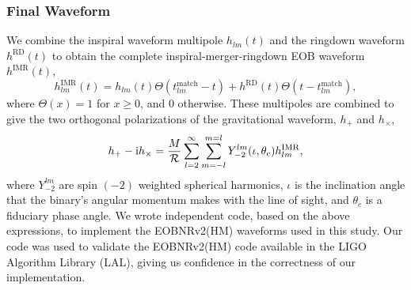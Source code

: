 \documentclass[aps,
prd,
amsmath,
amssymb,
twocolumn,
floatfix,
groupedaddress]{revtex4-1}
\newcommand{\Sum}{\displaystyle\sum\limits}
\newcommand{\ii}{{\rm i}}
\newcommand{\RD}{\mathrm{RD}}
\begin{document}
\subsubsection{Final Waveform}\label{sec:level3:FinalWaveform}
We combine the inspiral waveform multipole $h_{lm}(t)$ and the ringdown waveform $h^{\RD}(t)$ to obtain the complete inspiral-merger-ringdown EOB waveform $h^{\textrm{IMR}}(t)$,
\begin{equation}
h^{\textrm{IMR}}_{lm}(t) = h_{lm}(t)\Theta(t^{\mathrm{match}}_{lm}-t) + h^{\RD}(t)\Theta(t-t^{\mathrm{match}}_{lm}),
\end{equation}
where $\Theta(x)=1$ for $x\geq 0$, and 0 otherwise. These multipoles are combined to give the two orthogonal polarizations of the gravitational waveform, $h_+$ and $h_{\times}$, 
\begin{equation}
h_+ - \ii h_{\times} = \dfrac{M}{\mathcal{R}} \Sum^{\infty}_{l=2} \Sum^{m=l}_{m = -l} Y^{lm}_{-2}(\iota,\theta_c) h^{\mathrm{IMR}}_{lm},
\end{equation}
where $Y^{lm}_{-2}$ are spin $(-2)$ weighted spherical harmonics, $\iota$ is the inclination angle that the binary's angular momentum makes with the line of sight, and $\theta_c$ is a fiduciary phase angle. We wrote independent code, based on the above expressions, to implement the EOBNRv2(HM) waveforms used in this study. Our code was used to validate the EOBNRv2(HM) code available in the LIGO Algorithm Library (LAL), giving us confidence in the correctness of our implementation.
\end{document}
